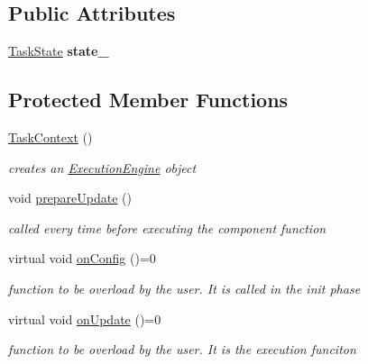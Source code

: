\subsection*{Public Attributes}
\begin{DoxyCompactItemize}
\item 
\hypertarget{classcoco_1_1_task_context_a47d34de836289ab6a137c8e0d584bcc0}{\hyperlink{namespacecoco_afec53814046619bac93c2077706a6bd1}{Task\-State} {\bfseries state\-\_\-}}\label{classcoco_1_1_task_context_a47d34de836289ab6a137c8e0d584bcc0}

\end{DoxyCompactItemize}
\subsection*{Protected Member Functions}
\begin{DoxyCompactItemize}
\item 
\hypertarget{classcoco_1_1_task_context_a2254f581ed334e5273246e88c05ddfed}{\hyperlink{classcoco_1_1_task_context_a2254f581ed334e5273246e88c05ddfed}{Task\-Context} ()}\label{classcoco_1_1_task_context_a2254f581ed334e5273246e88c05ddfed}

\begin{DoxyCompactList}\small\item\em creates an \hyperlink{classcoco_1_1_execution_engine}{Execution\-Engine} object \end{DoxyCompactList}\item 
\hypertarget{classcoco_1_1_task_context_af59449d7988feaec409dfcb6173d2a41}{void \hyperlink{classcoco_1_1_task_context_af59449d7988feaec409dfcb6173d2a41}{prepare\-Update} ()}\label{classcoco_1_1_task_context_af59449d7988feaec409dfcb6173d2a41}

\begin{DoxyCompactList}\small\item\em called every time before executing the component function \end{DoxyCompactList}\item 
\hypertarget{classcoco_1_1_task_context_a397ba5231353db343c71280ca0502459}{virtual void \hyperlink{classcoco_1_1_task_context_a397ba5231353db343c71280ca0502459}{on\-Config} ()=0}\label{classcoco_1_1_task_context_a397ba5231353db343c71280ca0502459}

\begin{DoxyCompactList}\small\item\em function to be overload by the user. It is called in the init phase \end{DoxyCompactList}\item 
\hypertarget{classcoco_1_1_task_context_a75a4efc25d04977d15bfdd8407d29d07}{virtual void \hyperlink{classcoco_1_1_task_context_a75a4efc25d04977d15bfdd8407d29d07}{on\-Update} ()=0}\label{classcoco_1_1_task_context_a75a4efc25d04977d15bfdd8407d29d07}

\begin{DoxyCompactList}\small\item\em function to be overload by the user. It is the execution funciton \end{DoxyCompactList}\end{DoxyCompactItemize}

